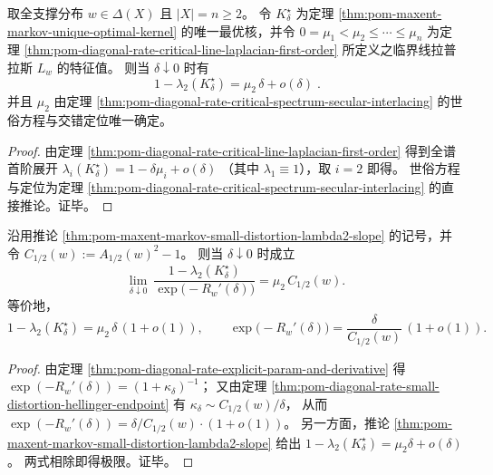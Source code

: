 \begin{corollary}\label{thm:pom-maxent-markov-small-distortion-lambda2-slope}
取全支撑分布 \(w\in\Delta(X)\) 且 \(|X|=n\ge 2\)。
令 \(K^\star_\delta\) 为定理 \ref{thm:pom-maxent-markov-unique-optimal-kernel} 的唯一最优核，并令
\(
0=\mu_1<\mu_2\le\cdots\le\mu_n
\)
为定理 \ref{thm:pom-diagonal-rate-critical-line-laplacian-first-order} 所定义之临界线拉普拉斯 \(L_w\) 的特征值。
则当 \(\delta\downarrow 0\) 时有
\[
\boxed{\;
1-\lambda_2(K^\star_\delta)=\mu_2\,\delta+o(\delta)\; }.
\]
并且 \(\mu_2\) 由定理 \ref{thm:pom-diagonal-rate-critical-spectrum-secular-interlacing} 的世俗方程与交错定位唯一确定。
\end{corollary}
\begin{proof}
由定理 \ref{thm:pom-diagonal-rate-critical-line-laplacian-first-order} 得到全谱首阶展开
\(
\lambda_i(K^\star_\delta)=1-\delta\mu_i+o(\delta)
\)
（其中 \(\lambda_1\equiv 1\)），取 \(i=2\) 即得。
世俗方程与定位为定理 \ref{thm:pom-diagonal-rate-critical-spectrum-secular-interlacing} 的直接推论。证毕。
\end{proof}

\begin{corollary}\label{cor:pom-maxent-markov-gap-vs-rate-slope-coupling}
沿用推论 \ref{thm:pom-maxent-markov-small-distortion-lambda2-slope} 的记号，并令
\(
C_{1/2}(w):=A_{1/2}(w)^2-1
\)。
则当 \(\delta\downarrow 0\) 时成立
\[
\lim_{\delta\downarrow 0}\ \frac{1-\lambda_2(K^\star_\delta)}{\exp\bigl(-R_w'(\delta)\bigr)}
=\mu_2\,C_{1/2}(w).
\]
等价地，
\[
1-\lambda_2(K^\star_\delta)=\mu_2\,\delta\,(1+o(1)),
\qquad
\exp\bigl(-R_w'(\delta)\bigr)=\frac{\delta}{C_{1/2}(w)}\,(1+o(1)).
\]
\end{corollary}
\begin{proof}
由定理 \ref{thm:pom-diagonal-rate-explicit-param-and-derivative} 得
\(
\exp(-R_w'(\delta))=(1+\kappa_\delta)^{-1}
\)；
又由定理 \ref{thm:pom-diagonal-rate-small-distortion-hellinger-endpoint} 有 \(\kappa_\delta\sim C_{1/2}(w)/\delta\)，
从而 \(\exp(-R_w'(\delta))=\delta/C_{1/2}(w)\cdot(1+o(1))\)。
另一方面，推论 \ref{thm:pom-maxent-markov-small-distortion-lambda2-slope} 给出
\(
1-\lambda_2(K^\star_\delta)=\mu_2\delta+o(\delta)
\)。
两式相除即得极限。证毕。
\end{proof}

